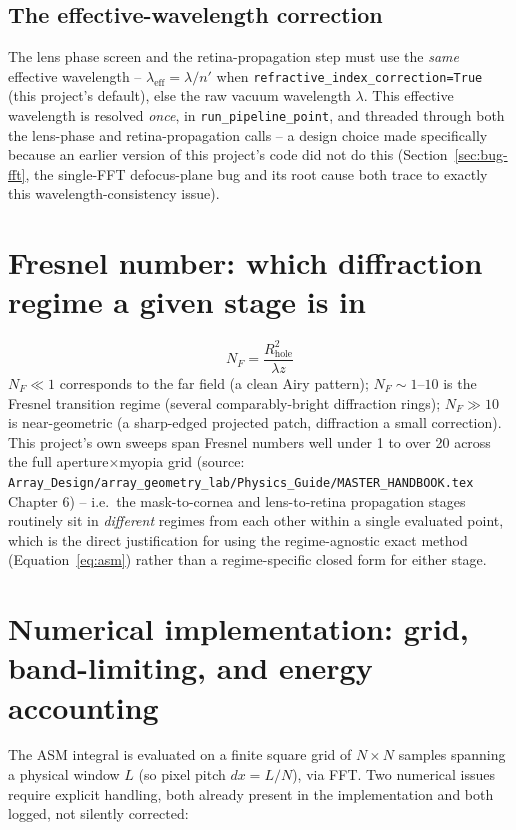\subsection{The effective-wavelength correction}
\label{sec:wavelength-correction}
The lens phase screen and the retina-propagation step must use the \emph{same}
effective wavelength -- $\lambda_{\mathrm{eff}}=\lambda/n'$ when
\texttt{refractive\_index\_correction=True} (this project's default), else the raw
vacuum wavelength $\lambda$. This effective wavelength is resolved \emph{once}, in
\texttt{run\_pipeline\_point}, and threaded through both the lens-phase and
retina-propagation calls -- a design choice made specifically because an earlier
version of this project's code did not do this (Section~\ref{sec:bug-fft}, the
single-FFT defocus-plane bug and its root cause both trace to exactly this
wavelength-consistency issue).

\section{Fresnel number: which diffraction regime a given stage is in}
\label{sec:fresnel-number}
\begin{equation}
N_F = \frac{R_{\mathrm{hole}}^2}{\lambda z}
\end{equation}
$N_F \ll 1$ corresponds to the far field (a clean Airy pattern); $N_F \sim 1$--$10$ is
the Fresnel transition regime (several comparably-bright diffraction rings); $N_F \gg
10$ is near-geometric (a sharp-edged projected patch, diffraction a small correction).
This project's own sweeps span Fresnel numbers well under 1 to over 20 across the
full aperture$\times$myopia grid (source:
\texttt{Array\_Design/array\_geometry\_lab/Physics\_Guide/MASTER\_HANDBOOK.tex} Chapter 6)
-- i.e.\ the mask-to-cornea and lens-to-retina propagation stages routinely sit in
\emph{different} regimes from each other within a single evaluated point, which is the
direct justification for using the regime-agnostic exact method (Equation~\ref{eq:asm})
rather than a regime-specific closed form for either stage.

\section{Numerical implementation: grid, band-limiting, and energy accounting}
\label{sec:numerics}
The ASM integral is evaluated on a finite square grid of $N\times N$ samples spanning a
physical window $L$ (so pixel pitch $dx=L/N$), via FFT. Two numerical issues require
explicit handling, both already present in the implementation and both logged, not
silently corrected:

